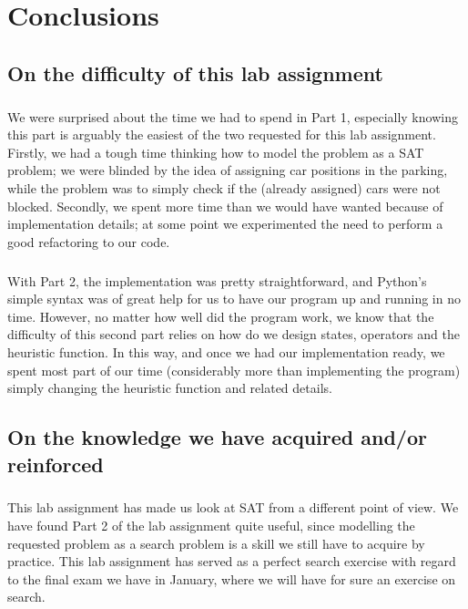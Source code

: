 \chapter{Conclusions}
\label{chapter: conclusions}

\section{On the difficulty of this lab assignment}

\paragraph{}
We were surprised about the time we had to spend in Part 1, especially knowing this part is arguably the easiest of the two requested for this lab assignment. Firstly, we had a tough time thinking how to model the problem as a SAT problem; we were blinded by the idea of assigning car positions in the parking, while the problem was to simply check if the (already assigned) cars were not blocked. Secondly, we spent more time than we would have wanted because of implementation details; at some point we experimented the need to perform a good refactoring to our code.

\paragraph{}
With Part 2, the implementation was pretty straightforward, and Python's simple syntax was of great help for us to have our program up and running in no time. However, no matter how well did the program work, we know that the difficulty of this second part relies on how do we design states, operators and the heuristic function. In this way, and once we had our implementation ready, we spent most part of our time (considerably more than implementing the program) simply changing the heuristic function and related details.

\section{On the knowledge we have acquired and/or reinforced}

\paragraph{}
This lab assignment has made us look at SAT from a different point of view. We have found Part 2 of the lab assignment quite useful, since modelling the requested problem as a search problem is a skill we still have to acquire by practice. This lab assignment has served as a perfect search exercise with regard to the final exam we have in January, where we will have for sure an exercise on search.
